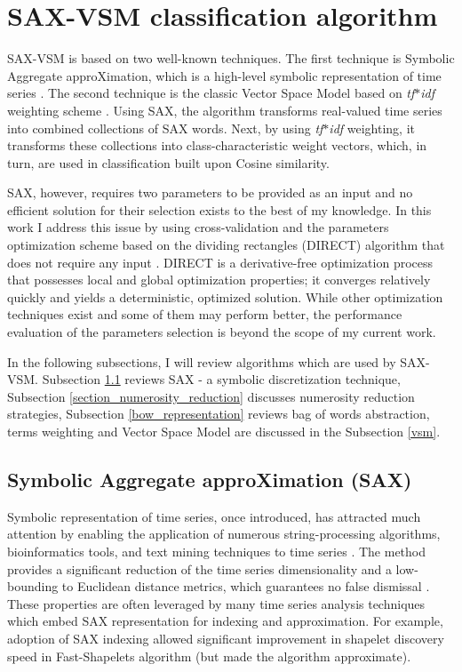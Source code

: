 \section{SAX-VSM classification algorithm} \label{sax_vsm_background}
SAX-VSM is based on two well-known techniques. The first technique is Symbolic Aggregate approXimation, which is a high-level symbolic
representation of time series \cite{sax}. The second technique is the classic Vector Space Model based on \textit{tf$\ast$idf} weighting 
scheme \cite{citeulike:300428}. 
Using SAX, the algorithm transforms real-valued time series into combined collections of SAX words. 
Next, by using \textit{tf$\ast$idf} weighting, it transforms these collections into class-characteristic weight vectors, 
which, in turn, are used in classification built upon Cosine similarity.

SAX, however, requires two parameters to be provided as an input and no efficient solution for their selection exists to the best of my knowledge. 
In this work I address this issue by using cross-validation and the parameters optimization scheme based on the dividing rectangles (DIRECT) 
algorithm that does not require any input \cite{citeulike:12563460}. 
DIRECT is a derivative-free optimization process that possesses local and global optimization properties; it converges relatively quickly and yields 
a deterministic, optimized solution. While other optimization techniques exist and some of them may perform better, the performance 
evaluation of the parameters selection is beyond the scope of my current work.

In the following subsections, I will review algorithms which are used by SAX-VSM. Subsection \ref{section-sax} reviews SAX - a symbolic 
discretization technique, Subsection \ref{section_numerosity_reduction} discusses numerosity reduction strategies,
Subsection \ref{bow_representation} reviews bag of words abstraction, terms weighting and Vector Space Model are discussed in the 
Subsection \ref{vsm}. 

\subsection{Symbolic Aggregate approXimation (SAX)}\label{section-sax}
Symbolic representation of time series, once introduced, has attracted much attention by enabling the application of numerous 
string-processing algorithms, bioinformatics tools, and text mining techniques to time series \cite{sax}. 
The method provides a significant reduction of the time series dimensionality and a low-bounding to Euclidean distance 
metrics, which guarantees no false dismissal \cite{citeulike:2821475}. 
These properties are often leveraged by many time series analysis techniques which embed SAX representation for indexing and 
approximation. For example, adoption of SAX indexing allowed significant improvement in shapelet discovery speed in Fast-Shapelets 
algorithm \cite{citeulike:12563493} (but made the algorithm approximate). 

